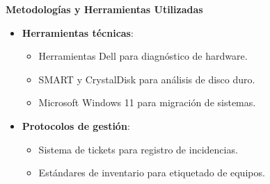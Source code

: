 \textbf{Metodologías y Herramientas Utilizadas}
\begin{itemize}
	\item \textbf{Herramientas técnicas}:
	\begin{itemize}
		\item Herramientas Dell para diagnóstico de hardware.
		\item SMART y CrystalDisk para análisis de disco duro.
		\item Microsoft Windows 11 para migración de sistemas.
	\end{itemize}
	
	\item \textbf{Protocolos de gestión}:
	\begin{itemize}
		\item Sistema de tickets para registro de incidencias.
		\item Estándares de inventario para etiquetado de equipos.
	\end{itemize}
\end{itemize}

